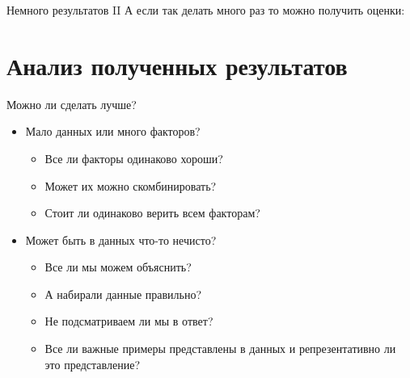 \documentclass[14pt, fleqn, xcolor={dvipsnames, table}, hyperref={unicode}, babel={english,russian}, inputenc=utf8x]{beamer}
\begin{document}
\begin{frame}{Немного результатов II}
А если так делать много раз то можно получить оценки:
\scriptsize
{}
\end{frame}

\section{Анализ полученных результатов}
\begin{frame}{Можно ли сделать лучше?}
\begin{itemize}
  \item Мало данных или много факторов?
  \begin{itemize}
    \item Все ли факторы одинаково хороши?
    \item Может их можно скомбинировать?
    \item Стоит ли одинаково верить всем факторам?
  \end{itemize}
  \item Может быть в данных что-то нечисто?
  \begin{itemize}
    \item Все ли мы можем объяснить?
    \item А набирали данные правильно?
    \item Не подсматриваем ли мы в ответ?
    \item Все ли важные примеры представлены в данных и репрезентативно ли это представление?
  \end{itemize}
\end{itemize}
\end{frame}
\end{document}
